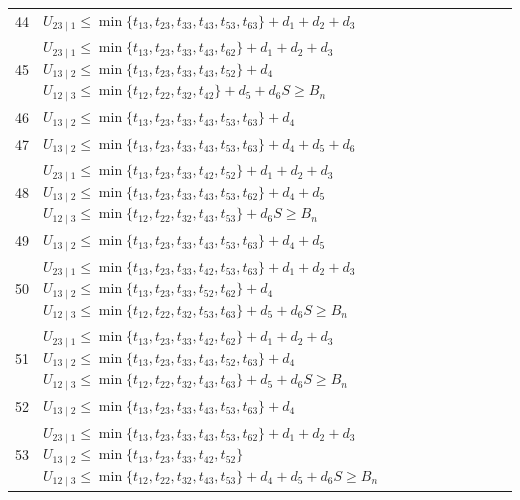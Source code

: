 \documentclass[a4paper,11pt]{amsart}
\numberwithin{equation}{section}
\theoremstyle{definition}
\theoremstyle{remark}
\begin{document}
{\begin{longtable}{@{}r>{\raggedright\arraybackslash}p{12.9cm}@{}}
44 & \(U_{23\mid 1}\leq \min\{t_{13},t_{23},t_{33},t_{43},t_{53},t_{63}\}+d_{1}+d_{2}+d_{3}\)\\[3pt]
45 & \(U_{23\mid 1}\leq \min\{t_{13},t_{23},t_{33},t_{43},t_{62}\}+d_{1}+d_{2}+d_{3}\)\newline \(U_{13\mid 2}\leq \min\{t_{13},t_{23},t_{33},t_{43},t_{52}\}+d_{4}\)\newline \(U_{12\mid 3}\leq \min\{t_{12},t_{22},t_{32},t_{42}\}+d_{5}+d_{6}\)\newline \(S\geq B_n\)\\[3pt]
46 & \(U_{13\mid 2}\leq \min\{t_{13},t_{23},t_{33},t_{43},t_{53},t_{63}\}+d_{4}\)\\[3pt]
47 & \(U_{13\mid 2}\leq \min\{t_{13},t_{23},t_{33},t_{43},t_{53},t_{63}\}+d_{4}+d_{5}+d_{6}\)\\[3pt]
48 & \(U_{23\mid 1}\leq \min\{t_{13},t_{23},t_{33},t_{42},t_{52}\}+d_{1}+d_{2}+d_{3}\)\newline \(U_{13\mid 2}\leq \min\{t_{13},t_{23},t_{33},t_{43},t_{53},t_{62}\}+d_{4}+d_{5}\)\newline \(U_{12\mid 3}\leq \min\{t_{12},t_{22},t_{32},t_{43},t_{53}\}+d_{6}\)\newline \(S\geq B_n\)\\[3pt]
49 & \(U_{13\mid 2}\leq \min\{t_{13},t_{23},t_{33},t_{43},t_{53},t_{63}\}+d_{4}+d_{5}\)\\[3pt]
50 & \(U_{23\mid 1}\leq \min\{t_{13},t_{23},t_{33},t_{42},t_{53},t_{63}\}+d_{1}+d_{2}+d_{3}\)\newline \(U_{13\mid 2}\leq \min\{t_{13},t_{23},t_{33},t_{52},t_{62}\}+d_{4}\)\newline \(U_{12\mid 3}\leq \min\{t_{12},t_{22},t_{32},t_{53},t_{63}\}+d_{5}+d_{6}\)\newline \(S\geq B_n\)\\[3pt]
51 & \(U_{23\mid 1}\leq \min\{t_{13},t_{23},t_{33},t_{42},t_{62}\}+d_{1}+d_{2}+d_{3}\)\newline \(U_{13\mid 2}\leq \min\{t_{13},t_{23},t_{33},t_{43},t_{52},t_{63}\}+d_{4}\)\newline \(U_{12\mid 3}\leq \min\{t_{12},t_{22},t_{32},t_{43},t_{63}\}+d_{5}+d_{6}\)\newline \(S\geq B_n\)\\[3pt]
52 & \(U_{13\mid 2}\leq \min\{t_{13},t_{23},t_{33},t_{43},t_{53},t_{63}\}+d_{4}\)\\[3pt]
53 & \(U_{23\mid 1}\leq \min\{t_{13},t_{23},t_{33},t_{43},t_{53},t_{62}\}+d_{1}+d_{2}+d_{3}\)\newline \(U_{13\mid 2}\leq \min\{t_{13},t_{23},t_{33},t_{42},t_{52}\}\)\newline \(U_{12\mid 3}\leq \min\{t_{12},t_{22},t_{32},t_{43},t_{53}\}+d_{4}+d_{5}+d_{6}\)\newline \(S\geq B_n\)\\[3pt]

\end{longtable}}
\end{document}
